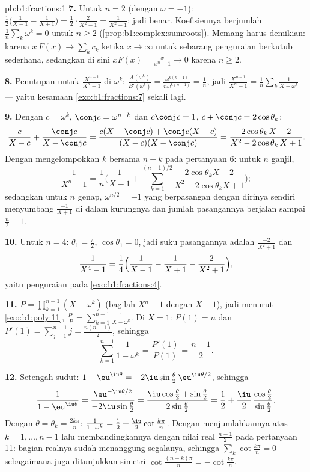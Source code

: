 \begin{solution}{pb:b1:fractions:1}
\textbf{7.} Untuk $n = 2$ (dengan $\omega = -1$): $\frac12\bigl(
\frac1{X-1} - \frac1{X+1}\bigr) = \frac12\cdot\frac{2}{X^2-1} =
\frac1{X^2-1}$: jadi benar. Koefisiennya berjumlah
$\frac1n\sum_k\omega^k = 0$ untuk $n \geq 2$
(\cref{prop:b1:complex:sumroots}). Memang harus demikian: karena $x\,F(x) \to
\sum_k c_k$ ketika $x \to \infty$ untuk sebarang penguraian berkutub
sederhana, sedangkan di sini $xF(x) = \frac{x}{x^n-1} \to 0$ karena $n \geq
2$.

\textbf{8.} Penutupan untuk $\frac{X^{n-1}}{X^n - 1}$ di $\omega^k$:
$\frac{A(\omega^k)}{B'(\omega^k)} =
\frac{\omega^{k(n-1)}}{n\omega^{k(n-1)}} = \frac1n$, jadi
$\frac{X^{n-1}}{X^n-1} = \frac1n\sum_k\frac1{X - \omega^k}$ ---
yaitu kesamaan \cref{exo:b1:fractions:7} sekali lagi.

\textbf{9.} Dengan $c = \omega^k$, $\conj c = \omega^{n-k}$ dan
$c\conj c = 1$, $c + \conj c = 2\cos\theta_k$:
\[
\frac{c}{X - c} + \frac{\conj c}{X - \conj c}
= \frac{c(X - \conj c) + \conj c(X - c)}
{(X - c)(X - \conj c)}
= \frac{2\cos\theta_k\,X - 2}{X^2 - 2\cos\theta_k\,X + 1} .
\]
Dengan mengelompokkan $k$ bersama $n - k$ pada pertanyaan 6: untuk $n$ ganjil,
\[
\frac1{X^n - 1} = \frac1n\Biggl(\frac1{X-1} +
\sum_{k=1}^{(n-1)/2}
\frac{2\cos\theta_k X - 2}{X^2 - 2\cos\theta_k X + 1}\Biggr) ;
\]
sedangkan untuk $n$ genap,  $\omega^{n/2} = -1$ yang berpasangan dengan
dirinya sendiri menyumbang $\frac{-1}{X+1}$ di dalam kurungnya dan jumlah
pasangannya berjalan sampai $\frac n2 - 1$.

\textbf{10.} Untuk $n = 4$: $\theta_1 = \frac\pi2$, $\cos\theta_1 = 0$,
jadi suku pasangannya adalah $\frac{-2}{X^2+1}$ dan
\[
\frac1{X^4-1} = \frac14\Bigl(\frac1{X-1} - \frac1{X+1}
- \frac2{X^2+1}\Bigr) ,
\]
yaitu penguraian pada \cref{exo:b1:fractions:4}.

\textbf{11.} $P = \prod_{k=1}^{n-1}(X - \omega^k)$ (bagilah $X^n -
1$ dengan $X - 1$), jadi menurut \cref{exo:b1:poly:11}, $\frac{P'}P =
\sum_{k=1}^{n-1}\frac1{X-\omega^k}$. Di $X = 1$: $P(1) = n$ dan
$P'(1) = \sum_{j=1}^{n-1}j = \frac{n(n-1)}2$, sehingga
\[
\sum_{k=1}^{n-1}\frac1{1 - \omega^k}
= \frac{P'(1)}{P(1)} = \frac{n-1}2 .
\]

\textbf{12.} Setengah sudut: $1 - \eu^{\iu\theta} =
-2\iu\sin\frac\theta2\,\eu^{\iu\theta/2}$, sehingga
\[
\frac1{1 - \eu^{\iu\theta}}
= \frac{\eu^{-\iu\theta/2}}{-2\iu\sin\frac\theta2}
= \frac{\iu\cos\frac\theta2 + \sin\frac\theta2}
{2\sin\frac\theta2}
= \frac12 + \frac\iu2\,
\frac{\cos\frac\theta2}{\sin\frac\theta2} .
\]
Dengan $\theta = \theta_k = \frac{2k\pi}n$: $\frac1{1-\omega^k} =
\frac12 + \frac\iu2\cot\frac{k\pi}n$. Dengan menjumlahkannya atas $k = 1, \dots,
n-1$ lalu membandingkannya dengan nilai real $\frac{n-1}2$ pada
pertanyaan 11: bagian realnya sudah menanggung segalanya, sehingga
$\sum_k\cot\frac{k\pi}n = 0$ --- sebagaimana juga ditunjukkan simetri $\cot\frac{(n-k)
\pi}n = -\cot\frac{k\pi}n$.


\end{solution}
